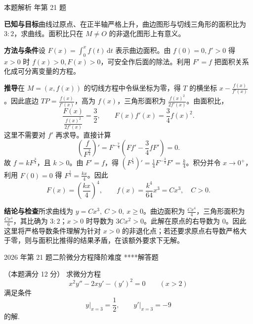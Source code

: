 \documentclass[UTF8,zihao=-4,fontset=fandol]{ctexart}
\newcounter{BankQuestion}
\newcommand{\QuestionPage}[7]{%
  \stepcounter{BankQuestion}%
  \par\noindent\begin{minipage}{\linewidth}
  \raggedright
  {\small\textcolor{black!60}{#3\quad #5\quad 难度 #7}\hfill\textcolor{accent}{#2}}\par\smallskip}
\newcommand{\QuestionEnd}{\end{minipage}\par\medskip}
\newcommand{\QuestionPage}[7]{%
  \clearpage
  \stepcounter{BankQuestion}%
  {\small\textcolor{accent}{#1\hfill #2}}\par\medskip
  {\small\textcolor{black!60}{#3\quad #5\quad 难度 #7\hfill \arabic{BankQuestion} / 234}}\par\vspace{9bp}}
\newcommand{\QuestionEnd}{}
\newenvironment{QuestionSolution}[1]{%
  \clearpage
  {\small\textcolor{black!60}{本题解析\quad #1}}\par\medskip
}{\par\clearpage}
\begin{document}
\begin{QuestionSolution}{2020 年第 21 题}
\textbf{已知与目标}\quad 曲线过原点、在正半轴严格上升，曲边图形与切线三角形的面积比为 \(3:2\)，求曲线。面积比只在 \(M\ne O\) 的非退化图形上有意义。

\textbf{方法与条件}\quad 设 \(F(x)=\int_0^x f(t)\,\mathrm{d}t\) 表示曲边面积。由 \(f(0)=0,f'>0\) 得 \(x>0\) 时 \(f(x)>0,F(x)>0\)，可安全作后面的除法。利用 \(F'=f\) 把面积关系化成可分离变量的方程。

\textbf{推导}\quad 在 \(M=(x,f(x))\) 的切线方程中令纵坐标为零，得 \(T\) 的横坐标 \(x-\frac{f(x)}{f'(x)}\)。因此底边 \(TP=\frac{f(x)}{f'(x)}\)，高为 \(f(x)\)，三角形面积为 \(\frac{f(x)^2}{2f'(x)}\)。由面积比，
\[
\frac{F(x)}{\frac{f(x)^2}{2f'(x)}}=\frac{3}{2},
\qquad F(x)f'(x)=\frac{3}{4}f(x)^2.
\]
这里不需要对 \(f'\) 再求导。直接计算
\[
\left(\frac{f}{F^{\frac{3}{4}}}\right)'
=F^{-\frac{7}{4}}\left(Ff'-\frac{3}{4}fF'\right)=0.
\]
故 \(f=kF^{\frac{3}{4}}\)，且 \(k>0\)。由 \(F'=f\)，得 \((F^{\frac{1}{4}})'=\frac{1}{4}F^{-\frac{3}{4}}F'=\frac{k}{4}\)。积分并令 \(x\to0^+\)，利用 \(F(0)=0\) 得 \(F^{\frac{1}{4}}=\frac{kx}{4}\)。因此
\[
F(x)=\left(\frac{kx}{4}\right)^4,
\qquad f(x)=\frac{k^4}{64}x^3=Cx^3,\quad C>0.
\]

\textbf{结论与检查}\quad 所求曲线为 \(\boxed{y=Cx^3,\ C>0,\ x\ge0}\)。曲边面积为 \(\frac{Cx^4}{4}\)，三角形面积为 \(\frac{Cx^4}{6}\)，其比确为 \(3:2\)；\(x>0\) 时导数为 \(3Cx^2>0\)。此解在原点的右导数为 \(0\)。因此这里将严格导数条件理解为针对 \(x>0\) 的非退化点；若还要求原点右导数严格大于零，则与面积比推得的结果矛盾，在该额外要求下无解。
\end{QuestionSolution}

\QuestionPage{4.1 几类简单的微分方程}{解答题}{2026 年第 21 题}{2}{二阶微分方程降阶}{218 / 234}{****}
（本题满分 12 分）
求微分方程
\[x^2y''-2xy'-(y')^2=0\qquad (x>2)
\]
满足条件
\[y\big|_{x=3}=\frac12,\qquad y'\big|_{x=3}=-9
\]
的解.
\QuestionEnd
\end{document}
